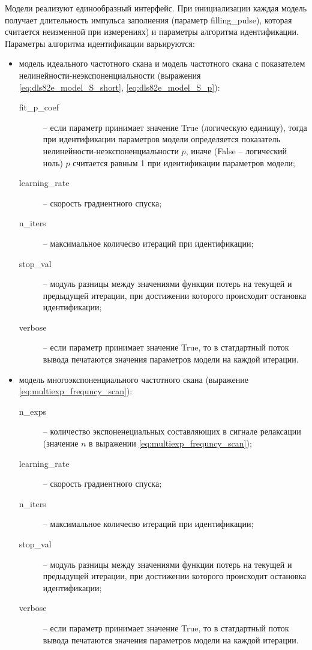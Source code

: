 	Модели реализуют единообразный интерфейс. При инициализации каждая модель 
	получает длительность импульса заполнения (параметр filling\_pulse),
	которая считается неизменной при измерениях) и параметры алгоритма 
	идентификации. Параметры алгоритма идентификации варьируются:
	\begin{itemize}
		\item модель идеального частотного скана и модель частотного скана с 
		показателем нелинейности-неэкспоненциальности (выражения 
		\ref{eq:dls82e_model_S_short}, \ref{eq:dls82e_model_S_p}): 
			\begin{description}
				\item[fit\_p\_coef] -- если параметр принимает значение True 
				(логическую единицу), тогда при идентификации параметров модели
				определяется показатель нелинейности-неэкспоненциальности $p$,
				иначе (False -- логический ноль) $p$ считается равным 1 при 
				идентификации параметров модели;
				\item[learning\_rate] -- скорость градиентного спуска;
				\item[n\_iters] -- максимальное количесво итераций при 
				идентификации;
				\item[stop\_val] -- модуль разницы между значениями функции 
				потерь на текущей и предыдущей итерации, при достижении которого
				происходит остановка идентификации;
				\item[verbose] -- если параметр принимает значение True, то в 
				статдартный поток вывода печатаются значения параметров модели
				на каждой итерации.
			\end{description}

		\item модель многоэкспоненциального частотного скана (выражение 
		\ref{eq:multiexp_frequncy_scan}):
			\begin{description}
				\item[n\_exps] -- количество экспоненециальных составляющих в 
				сигнале релаксации (значение $n$ в выражении 
				\ref{eq:multiexp_frequncy_scan});
				\item[learning\_rate] -- скорость градиентного спуска;
				\item[n\_iters] -- максимальное количесво итераций при 
				идентификации;
				\item[stop\_val] -- модуль разницы между значениями функции 
				потерь на текущей и предыдущей итерации, при достижении которого
				происходит остановка идентификации;
				\item[verbose] -- если параметр принимает значение True, то в 
				статдартный поток вывода печатаются значения параметров модели
				на каждой итерации.
			\end{description}
	\end{itemize}


